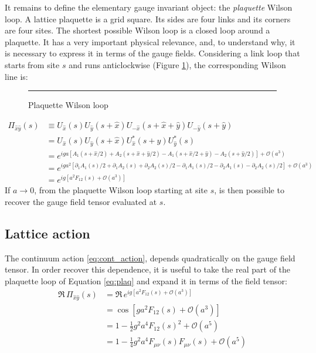 It remains to define the elementary gauge invariant object: the \emph{plaquette} Wilson loop.
A lattice plaquette is a grid square. Its sides are four links and its corners are four sites.
The shortest possible Wilson loop is a closed loop around a plaquette.
It has a very important physical relevance, and, to understand why,
it is necessary to express it in terms of the gauge fields.
Considering a link loop that starts from site $s$ and runs anticlockwise (Figure \ref{fig:plaq}),
the corresponding Wilson line is:
\begin{figure}[!htb]
    \centering
    \rule{3in}{1.5in}
    \caption{Plaquette Wilson loop}
    \label{fig:plaq}
\end{figure}
\begin{equation}\label{eq:plaq}
    \begin{aligned}
        \Pi_{\hat x\hat y}(s) &\equiv U_{\hat x}(s) U_{\hat y}(s+\hat x) U_{-\hat x}(s+\hat x+\hat y) U_{-\hat y}(s+\hat y) \\
                              &= U_{\hat x}(s) U_{\hat y}(s+\hat x) U^*_{\hat x}(s+\hat y) U^*_{\hat y}(s) \\
                              &= e^{iga[A_1(s+\hat x/2) + A_2(s+\hat x+\hat y/2) - A_1(s+\hat x/2+\hat y) - A_2(s+\hat y/2)]+ \mathcal O\left(a^3\right)} \\
                              &= e^{iga^2[\partial_1A_1(s)/2 + \partial_1A_2(s) + \partial_2A_2(s)/2 - \partial_1A_1(s)/2 - \partial_2A_1(s) - \partial_2A_2(s)/2] %
                                    + \mathcal O\left(a^3\right)} \\
                              &= e^{ig\left[a^2F_{12}(s) + \mathcal O\left(a^3\right)\right]}
    \end{aligned}
\end{equation}
If $a \to 0$, from the plaquette Wilson loop starting at site $s$, is then possible to recover the gauge field tensor evaluated at $s$.

\subsection*{Lattice action}

The continuum action \eqref{eq:cont_action}, depends quadratically on the gauge field tensor.
In order recover this dependence, it is useful to take the real part of the plaquette loop of Equation \eqref{eq:plaq} and expand it in terms of the field tensor:
\begin{align*}
    \Re\,\Pi_{\hat x\hat y}(s) &= \Re\,e^{ig\left[a^2F_{12}(s) + \mathcal O\left(a^3\right)\right]} \\
                                          &= \cos\left[ga^2F_{12}(s) + \mathcal O\left(a^3\right)\right] \\
                                          &= 1 - \frac{1}{2}g^2a^4F_{12}(s)^2 + \mathcal O\left(a^5\right) \\
                                          &= 1 - \frac{1}{4}g^2a^4F_{\mu\nu}(s)F_{\mu\nu}(s) + \mathcal O\left(a^5\right)
\end{align*}

